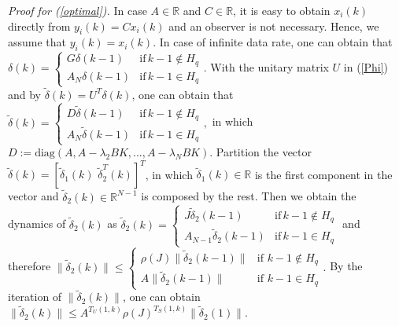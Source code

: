 \documentclass[letterpaper,journal,final,twocolumn]{IEEEtran}
\begin{document}
\emph{Proof for (\ref{optimal}).}
In case $A\in \mathbb R$ and $C \in \mathbb R$, it is easy to obtain $x_i(k)$ directly from $y_i(k) = Cx_i(k)$ and an observer is not necessary. Hence, we assume that $y_i(k)=x_i(k)$. In case of infinite data rate, one can obtain that 
$
\delta(k) = 
\left\{\!\!\!\!
\begin{array}{ll}
G\delta(k-1) & \text{if}\, k-1 \notin H_q \\
A_N\delta(k-1) & \text{if}\,k-1 \in H_q
\end{array}
\right.\!\!\! \!\!  .
$
With the unitary matrix $U$ in (\ref{Phi}) and by $\tilde \delta(k) = U ^ T \delta (k)$,  one can obtain that 
$
\tilde \delta(k) \!\!=\!\!  
\left\{\!\!\!
\begin{array}{ll}
D   \tilde \delta(k-1) & \text{if}\, k-1 \notin H_q \\
A_N \tilde \delta(k-1) & \text{if}\,k-1 \in H_q
\end{array}
\right.\!\!\!\!\!,
$
in which $D:= \text{diag}(A, A-\lambda_2BK, ..., A- \lambda_N BK)$.
Partition the vector $\tilde \delta(k)= [\tilde \delta_1 (k) \,\, \tilde \delta_2 ^ T (k) ] ^ T $, in which $\tilde \delta_1 (k) \in  \mathbb R $ is the first component in the vector and $\tilde \delta_2 (k) \in  \mathbb R ^ {N-1}$ is composed by the rest. Then we obtain the dynamics of $\tilde \delta_2 (k)$ as
$
\tilde \delta _ 2 (k)\!\! =\!\!  
\left\{\!\!\!
\begin{array}{ll}
J   \tilde \delta _ 2 (k-1) & \text{if}\, k-1 \notin H_q \\
A_{N-1} \tilde \delta _ 2 (k-1) & \text{if}\,k-1 \in H_q
\end{array}
\right.\!\!\!\!
$
and therefore
$
\|\tilde \delta _ 2 (k)\| \!\!\le\!\! 
\left\{\!\!\!\!
\begin{array}{ll}
\rho(J) \|\tilde \delta _ 2 (k-1)\| & \text{if}\,\, k-1 \notin H_q \\
A \|\tilde \delta _ 2(k-1)\| & \text{if}\,\, k-1 \in H_q 
\end{array}
\right.\!\!\!.
$
By the iteration of $\|\tilde \delta _ 2 (k)\|$, one can obtain $\|\tilde \delta_2 (k)\| \le A^ {T_U(1,k)} \rho(J) ^{T_S (1,k)} \|\tilde \delta_2(1)\| $. 
\end{document}
